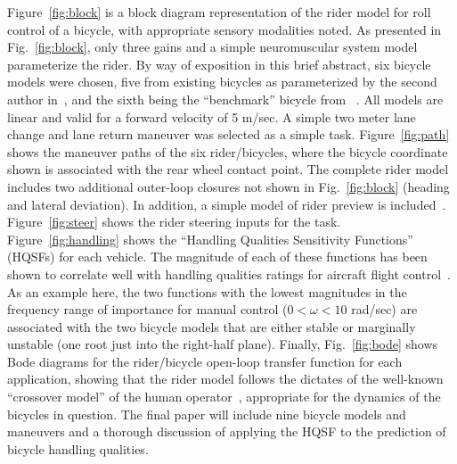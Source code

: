 \documentclass{bmd2010a}
\begin{document}
Figure~\ref{fig:block} is a block diagram representation of the
rider model for roll control of a bicycle, with appropriate sensory modalities
noted. As presented in Fig.~\ref{fig:block}, only three gains and a simple neuromuscular
system model parameterize the rider. By way of exposition in this brief
abstract, six bicycle models were chosen, five from existing bicycles as
parameterized by the second author in~\cite{Moore2010}, and the sixth being the ``benchmark'' bicycle from
~\cite{Meijaard2007}. All models are linear and valid for a forward velocity of 5 m/sec. A
simple two meter lane change and lane return maneuver was selected as a simple
task.
Figure~\ref{fig:path} shows the maneuver paths of the six rider/bicycles, where the bicycle
coordinate shown is associated with the rear wheel contact point. The complete
rider model includes two additional outer-loop closures not shown in
Fig.~\ref{fig:block} (heading and lateral deviation). In addition, a simple model of rider preview
is included~\cite{Hess2003a}. Figure~\ref{fig:steer} shows the rider steering inputs for the
task. Figure~\ref{fig:handling} shows the ``Handling Qualities Sensitivity
Functions'' (HQSFs) for each vehicle.
The magnitude of each of these functions has been shown to correlate well with
handling qualities ratings for aircraft flight control~\cite{Hess2006}. As an example here,
the two functions with the lowest magnitudes in the frequency range of
importance for manual control ($0<\omega<10$ rad/sec) are associated with the two
bicycle models that are either stable or marginally unstable (one root just
into the right-half plane). Finally, Fig.~\ref{fig:bode} shows Bode diagrams for the
rider/bicycle open-loop transfer function for each application, showing that
the rider model follows the dictates of the well-known ``crossover model'' of the
human operator~\cite{McRuer1974}, appropriate for the dynamics of the
bicycles in question. The final paper will include nine bicycle models and
maneuvers and a thorough discussion of applying the HQSF to the prediction of
bicycle handling qualities.
\end{document}
